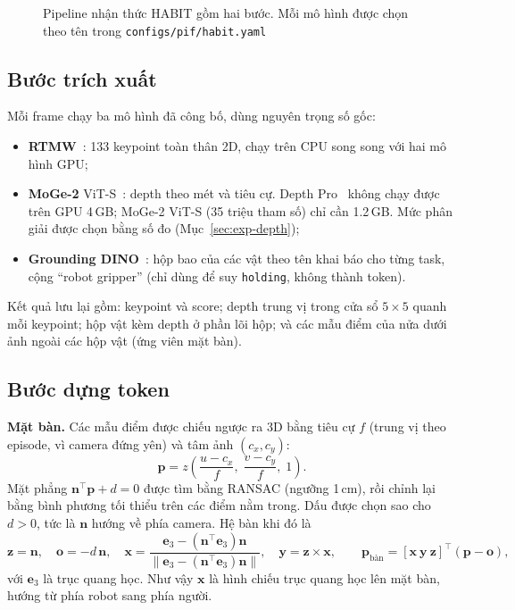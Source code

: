 \begin{figure}[H]
  \centering
  \fitfig{}
  \caption{Pipeline nhận thức HABIT gồm hai bước. Mỗi mô hình được chọn theo tên trong \texttt{configs/pif/habit.yaml}}
  \label{fig:perception}
\end{figure}

\subsection{Bước trích xuất}

Mỗi frame chạy ba mô hình đã công bố, dùng nguyên trọng số gốc:
\begin{itemize}
  \item \textbf{RTMW}~\cite{jiang2024rtmw}: 133 keypoint toàn thân 2D, chạy trên CPU song song với hai mô hình GPU;
  \item \textbf{MoGe-2} ViT-S~\cite{wang2025moge2}: depth theo mét và tiêu cự. Depth Pro~\cite{bochkovskii2025depthpro} không chạy được trên GPU 4\,GB; MoGe-2 ViT-S (35 triệu tham số) chỉ cần 1.2\,GB. Mức phân giải được chọn bằng số đo (Mục~\ref{sec:exp-depth});
  \item \textbf{Grounding DINO}~\cite{liu2024groundingdino}: hộp bao của các vật theo tên khai báo cho từng task, cộng ``robot gripper'' (chỉ dùng để suy \texttt{holding}, không thành token).
\end{itemize}
Kết quả lưu lại gồm: keypoint và score; depth trung vị trong cửa sổ $5\times5$ quanh mỗi keypoint; hộp vật kèm depth ở phần lõi hộp; và các mẫu điểm của nửa dưới ảnh ngoài các hộp vật (ứng viên mặt bàn).

\subsection{Bước dựng token}

\textbf{Mặt bàn.} Các mẫu điểm được chiếu ngược ra 3D bằng tiêu cự $f$ (trung vị theo episode, vì camera đứng yên) và tâm ảnh $(c_x,c_y)$:
\begin{equation}
  \mathbf{p}=z\left(\frac{u-c_x}{f},\;\frac{v-c_y}{f},\;1\right).
  \label{eq:backproject}
\end{equation}
Mặt phẳng $\mathbf{n}^\top\mathbf{p}+d=0$ được tìm bằng RANSAC (ngưỡng 1\,cm), rồi chỉnh lại bằng bình phương tối thiểu trên các điểm nằm trong. Dấu được chọn sao cho $d>0$, tức là $\mathbf{n}$ hướng về phía camera. Hệ bàn khi đó là
\begin{equation}
  \mathbf{z}=\mathbf{n},\quad \mathbf{o}=-d\,\mathbf{n},\quad
  \mathbf{x}=\frac{\mathbf{e}_3-(\mathbf{n}^\top\mathbf{e}_3)\mathbf{n}}{\|\mathbf{e}_3-(\mathbf{n}^\top\mathbf{e}_3)\mathbf{n}\|},\quad
  \mathbf{y}=\mathbf{z}\times\mathbf{x},\qquad
  \mathbf{p}_{\text{bàn}}=[\mathbf{x}\ \mathbf{y}\ \mathbf{z}]^\top(\mathbf{p}-\mathbf{o}),
  \label{eq:table-frame}
\end{equation}
với $\mathbf{e}_3$ là trục quang học. Như vậy $\mathbf{x}$ là hình chiếu trục quang học lên mặt bàn, hướng từ phía robot sang phía người.


